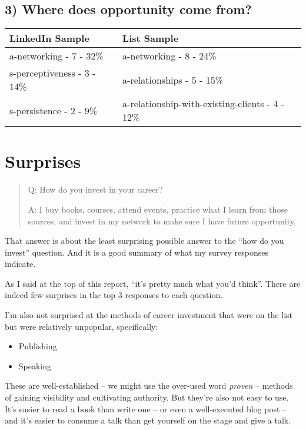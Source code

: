 \documentclass[13pt,]{tufte-handout}
\providecommand{\tightlist}{%
  \setlength{\itemsep}{0pt}\setlength{\parskip}{0pt}}
\begin{document}
\hypertarget{where-does-opportunity-come-from}{%
\subsection{3) Where does opportunity come
from?}\label{where-does-opportunity-come-from}}


\begin{longtable}[]{@{}ll@{}}
\toprule
LinkedIn Sample & List Sample\tabularnewline
\midrule
\endhead
a-networking - 7 - 32\% & a-networking - 8 - 24\%\tabularnewline
s-perceptiveness - 3 - 14\% & a-relationships - 5 - 15\%\tabularnewline
s-persistence - 2 - 9\% & a-relationship-with-existing-clients - 4 -
12\%\tabularnewline
\bottomrule
\end{longtable}

\hypertarget{surprises}{%
\section{Surprises}\label{surprises}}

\begin{quote}
Q: How do you invest in your career?

A: I buy books, courses, attend events, practice what I learn from those
sources, and invest in my network to make sure I have future
opportunity.
\end{quote}

That answer is about the least surprising possible answer to the ``how
do you invest'' question. And it is a good summary of what my survey
responses indicate.

As I said at the top of this report, ``it's pretty much what you'd
think''. There are indeed few surprises in the top 3 responses to each
question.

I'm also not surprised at the methods of career investment that were on
the list but were relatively unpopular, specifically:

\begin{itemize}
\tightlist
\item
  Publishing
\item
  Speaking
\end{itemize}

These are well-established -- we might use the over-used word
\emph{proven} -- methods of gaining visibility and cultivating
authority. But they're also not easy to use. It's easier to read a book
than write one -- or even a well-executed blog post -- and it's easier
to consume a talk than get yourself on the stage and give a talk.
\end{document}
